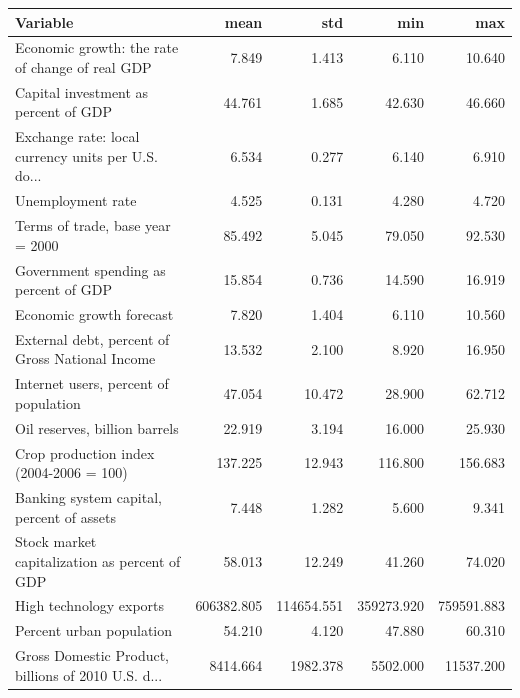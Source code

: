 \documentclass[11pt]{article}
\begin{document}
\begin{table}[H]
\begin{tabular}{lrrrr}
\toprule
{} Variable&         mean &         std &          min &          max \\
\midrule
Economic growth: the rate of change of real GDP    &        7.849 &       1.413 &        6.110 &       10.640 \\
Capital investment as percent of GDP               &       44.761 &       1.685 &       42.630 &       46.660 \\
Exchange rate: local currency units per U.S. do... &        6.534 &       0.277 &        6.140 &        6.910 \\
Unemployment rate                                  &        4.525 &       0.131 &        4.280 &        4.720 \\
Terms of trade, base year = 2000                   &       85.492 &       5.045 &       79.050 &       92.530 \\
Government spending as percent of GDP              &       15.854 &       0.736 &       14.590 &       16.919 \\
Economic growth forecast                           &        7.820 &       1.404 &        6.110 &       10.560 \\
External debt, percent of Gross National Income    &       13.532 &       2.100 &        8.920 &       16.950 \\
Internet users, percent of population              &       47.054 &      10.472 &       28.900 &       62.712 \\
Oil reserves, billion barrels                      &       22.919 &       3.194 &       16.000 &       25.930 \\
Crop production index (2004-2006 = 100)            &      137.225 &      12.943 &      116.800 &      156.683 \\
Banking system capital, percent of assets          &        7.448 &       1.282 &        5.600 &        9.341 \\
Stock market capitalization as percent of GDP      &       58.013 &      12.249 &       41.260 &       74.020 \\
High technology exports                            &   606382.805 &  114654.551 &   359273.920 &   759591.883 \\
Percent urban population                           &       54.210 &       4.120 &       47.880 &       60.310 \\
Gross Domestic Product, billions of 2010 U.S. d... &     8414.664 &    1982.378 &     5502.000 &    11537.200 \\

\end{tabular}
\end{table}
\end{document}
